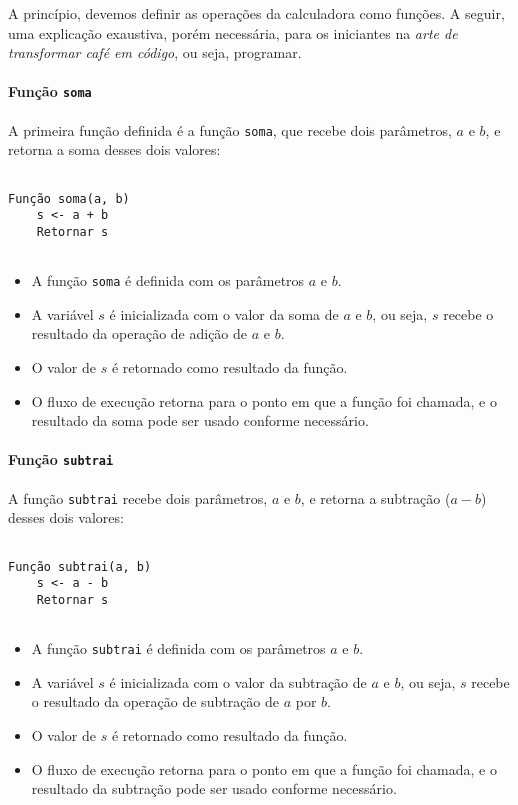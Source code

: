 \documentclass[a4paper, 12pt, onecolumn,singlespacing]{article}
\begin{document}
	A princípio, devemos definir as operações da calculadora como funções. A seguir, uma explicação exaustiva, porém necessária, para os iniciantes na \textit{arte de transformar café em código}, ou seja, programar.
	
	\paragraph{Função \texttt{soma}} A primeira função definida é a função \texttt{soma}, que recebe dois parâmetros, $a$ e $b$, e retorna a soma desses dois valores:
	
\begin{verbatim}

Função soma(a, b)
	s <- a + b
	Retornar s
	
\end{verbatim}

\begin{itemize}
	\item A função \texttt{soma} é definida com os parâmetros $a$ e $b$.
	\item A variável $s$ é inicializada com o valor da soma de $a$ e $b$, ou seja, $s$ recebe o resultado da operação de adição de $a$ e $b$.
	\item O valor de $s$ é retornado como resultado da função.
	\item O fluxo de execução retorna para o ponto em que a função foi chamada, e o resultado da soma pode ser usado conforme necessário.
\end{itemize}

	\paragraph{Função \texttt{subtrai}} A função \texttt{subtrai} recebe dois parâmetros, $a$ e $b$, e retorna a subtração ($a-b$) desses dois valores:

\begin{verbatim}
	
Função subtrai(a, b)
	s <- a - b
	Retornar s
	
\end{verbatim}

\begin{itemize}
	\item A função \texttt{subtrai} é definida com os parâmetros $a$ e $b$.
	\item A variável $s$ é inicializada com o valor da subtração de $a$ e $b$, ou seja, $s$ recebe o resultado da operação de subtração de $a$ por $b$.
	\item O valor de $s$ é retornado como resultado da função.
	\item O fluxo de execução retorna para o ponto em que a função foi chamada, e o resultado da subtração pode ser usado conforme necessário.
\end{itemize}
\end{document}
